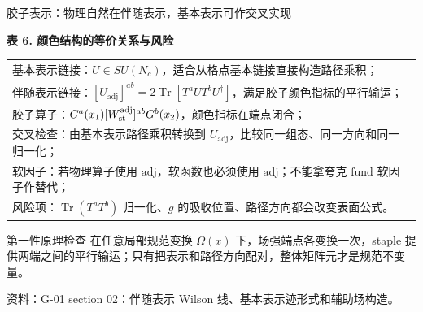 \documentclass[UTF8,aspectratio=169,11pt]{ctexbeamer}
\newcommand{\source}[1]{%
  \par\vspace{-0.08em}%
  \noindent\parbox[t]{0.97\linewidth}{\raggedright\scriptsize\color{muted}资料：#1}\par}
\newcommand{\Tr}{\operatorname{Tr}}
\newcommand{\ad}{\mathrm{adj}}
\newcommand{\fund}{\mathrm{fund}}
\begin{document}
\begin{frame}[t]{胶子表示：物理自然在伴随表示，基本表示可作交叉实现}
  \begin{center}
  \textbf{表 6. 颜色结构的等价关系与风险}
  \vspace{0.12em}
  \begin{tabular}{@{}p{\linewidth}@{}}
    \toprule
    基本表示链接：$U\in SU(N_c)$，适合从格点基本链接直接构造路径乘积；\\
    伴随表示链接：$[U_{\ad}]^{ab}=2\Tr[T^a U T^b U^\dagger]$，满足胶子颜色指标的平行输运；\\
    胶子算子：$G^a(x_1)[W_{\rm st}^{\ad}]^{ab}G^b(x_2)$，颜色指标在端点闭合；\\
    交叉检查：由基本表示路径乘积转换到 $U_{\ad}$，比较同一组态、同一方向和同一归一化；\\
    软因子：若物理算子使用 $\ad$，软函数也必须使用 $\ad$；不能拿夸克 $\fund$ 软因子作替代；\\
    风险项：$\Tr(T^aT^b)$ 归一化、$g$ 的吸收位置、路径方向都会改变表面公式。\\
    \bottomrule
  \end{tabular}
  \end{center}
  \begin{block}{第一性原理检查}
    在任意局部规范变换 $\Omega(x)$ 下，场强端点各变换一次，staple 提供两端之间的平行输运；只有把表示和路径方向配对，整体矩阵元才是规范不变量。
  \end{block}
  \source{G-01 section 02：伴随表示 Wilson 线、基本表示迹形式和辅助场构造。}
\end{frame}
\end{document}

